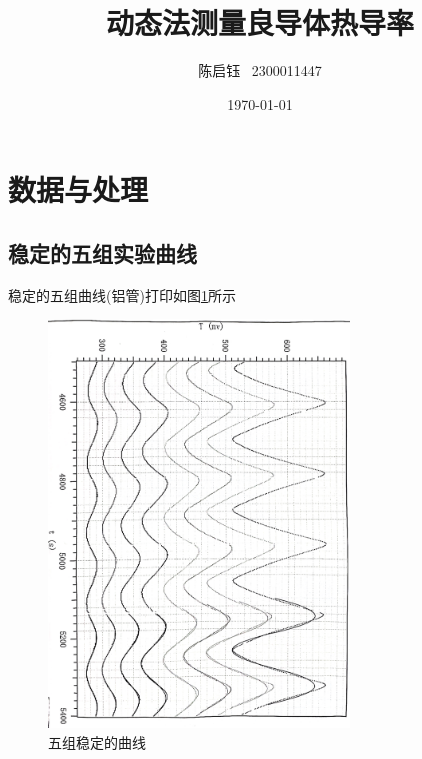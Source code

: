 \documentclass{ctexart}
\title{动态法测量良导体热导率}
\author{陈启钰\,\,\, 2300011447}
\date{\today}
\begin{document}
	\maketitle
	\newpage
	\section{数据与处理}	
	\subsection{稳定的五组实验曲线}
	稳定的五组曲线(铝管)打印如图\ref{fig:data}所示
	\begin{figure}[h]
		\centering
		\includegraphics[width=8cm,angle=90]{data.jpg}
		\caption{五组稳定的曲线}
		\label{fig:data}
	\end{figure}
\end{document}
